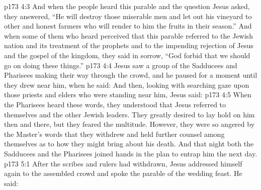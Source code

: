 \vs p173 4:3 \pc And when the people heard this parable and the question Jesus asked, they answered, “He will destroy those miserable men and let out his vineyard to other and honest farmers who will render to him the fruits in their season.” And when some of them who heard perceived that this parable referred to the Jewish nation and its treatment of the prophets and to the impending rejection of Jesus and the gospel of the kingdom, they said in sorrow, “God forbid that we should go on doing these things.”
\vs p173 4:4 Jesus saw a group of the Sadducees and Pharisees making their way through the crowd, and he paused for a moment until they drew near him, when he said:  And then, looking with searching gaze upon those priests and elders who were standing near him, Jesus said: 
\vs p173 4:5 When the Pharisees heard these words, they understood that Jesus referred to themselves and the other Jewish leaders. They greatly desired to lay hold on him then and there, but they feared the multitude. However, they were so angered by the Master’s words that they withdrew and held further counsel among themselves as to how they might bring about his death. And that night both the Sadducees and the Pharisees joined hands in the plan to entrap him the next day.
\vs p173 5:1 After the scribes and rulers had withdrawn, Jesus addressed himself again to the assembled crowd and spoke the parable of the wedding feast. He said:
